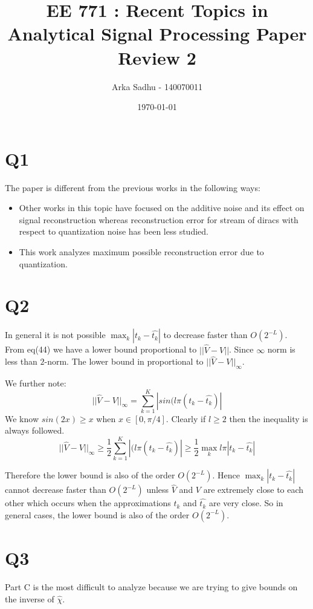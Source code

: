 \documentclass{article}
\title{EE 771 : Recent Topics in Analytical Signal Processing Paper Review 2}
\author{Arka Sadhu - 140070011}
\date{\today}
\begin{document}
\maketitle

\section*{Q1}
The paper is different from the previous works in the following ways:
\begin{itemize}
\item Other works in this topic have focused on the additive noise and its effect on signal reconstruction whereas reconstruction error for stream of diracs with respect to quantization noise has been less studied.
\item This work analyzes maximum possible reconstruction error due to quantization.
\end{itemize}

\section*{Q2}
In general it is not possible $\max_k |t_k - \hat{t_k}|$ to decrease faster than $O(2^{-L})$. From eq(44) we have a lower bound proportional to $||\hat{V} - V||$. Since $\infty$ norm is less than $2$-norm. The lower bound in proportional to $||\hat{V} - V||_{\infty}$.

We further note:
$$||\hat{V} - V||_{\infty} = \sum_{k=1}^K|sin(l \pi (t_k - \hat{t_k})|$$
We know $sin(2x) \ge x$ when $x \in [0, \pi / 4]$. Clearly if $l \ge 2$ then the inequality is always followed.
$$||\hat{V} - V||_{\infty} \ge \frac{1}{2}\sum_{k=1}^K|(l \pi (t_k - \hat{t_k})| \ge \frac{1}{2} \max_k l \pi |t_k - \hat{t_k}|$$

Therefore the lower bound is also of the order $O(2^{-L})$. Hence $\max_k |t_k - \hat{t_k}|$ cannot decrease faster than $O(2^{-L})$ unless $\hat{V}$ and $V$ are extremely close to each other which occurs when the approximations $t_k$ and $\hat{t_k}$ are very close. So in general cases, the lower bound is also of the order $O(2^{-L})$.

\section*{Q3}
Part C is the most difficult to analyze because we are trying to give bounds on the inverse of $\hat{\chi}$.
\end{document}
